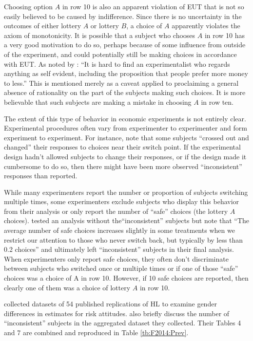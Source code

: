 \documentclass[../main.tex]{subfiles}
\begin{document}
Choosing option $A$ in row 10 is also an apparent violation of EUT that is not so easily believed to be caused by indifference.
Since there is no uncertainty in the outcomes of either lottery $A$ or lottery $B$, a choice of $A$ apparently violates the axiom of monotonicity.
It is possible that a subject who chooses $A$ in row 10 has a very good motivation to do so, perhaps because of some influence from outside of the experiment, and could potentially still be making choices in accordance with EUT.
As noted by \textcite[930]{Smith1982}: \enquote{It is hard to find an experimentalist who regards anything as self evident, including the proposition that people prefer more money to less.}
This is mentioned merely as a caveat applied to proclaiming a general absence of rationality on the part of the subjects making such choices. 
It is more believable that such subjects are making a mistake in choosing $A$ in row ten.

The extent of this type of behavior in economic experiments is not entirely clear.
Experimental procedures often vary from experimenter to experimenter and form experiment to experiment.
For instance, \textcite{Holt2002} note that some subjects \enquote{crossed out and changed} their responses to choices near their switch point.
If the experimental design hadn't allowed subjects to change their responses, or if the design made it cumbersome to do so, then there might have been more observed \enquote{inconsistent} responses than reported.

While many experimenters report the number or proportion of subjects switching multiple times, some experimenters exclude subjects who display this behavior from their analysis or only report the number of \enquote{safe} choices (the lottery $A$ choices).
\textcite[1648]{Holt2002} tested an analysis without the\enquote{inconsistent} subjects but note that \enquote{The average number of safe choices increases slightly in some treatments when we restrict our attention to those who never switch back, but typically by less than 0.2 choices} and ultimately left \enquote{inconsistent} subjects in their final analysis.
When experimenters only report safe choices, they often don't discriminate between subjects who switched once or multiple times or if one of those \enquote{safe} choices was a choice of A in row 10.
However, if 10 safe choices are reported, then clearly one of them was a choice of lottery $A$ in row 10.

\textcite[9]{Filippin2016} collected datasets of 54 published replications of HL to examine gender differences in estimates for risk attitudes.
\textcite[10-11, 17-18]{Filippin2016} also briefly discuss the number of \enquote{inconsistent} subjects in the aggregated dataset they collected.
Their Tables 4 and 7 are combined and reproduced in Table \ref{tb:F2014:Prev}.
\end{document}
